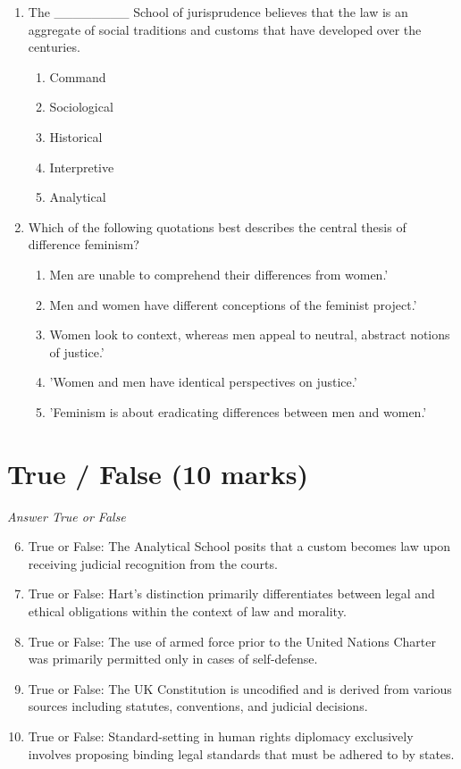 \documentclass[12pt]{article}
\begin{document}
\begin{enumerate}[label=\arabic*.]
\begin{enumerate}[label=(\alph*)]
    \item A common carrier delivering a new computer.
\end{enumerate}
\item The \_\_\_\_\_\_\_\_ School of jurisprudence believes that the law is an aggregate of social traditions and customs that have developed over the centuries.
\begin{enumerate}[label=(\alph*)]
    \item Command
    \item Sociological
    \item Historical
    \item Interpretive
    \item Analytical
\end{enumerate}
\item Which of the following quotations best describes the central thesis of difference feminism?
\begin{enumerate}[label=(\alph*)]
    \item Men are unable to comprehend their differences from women.'
    \item Men and women have different conceptions of the feminist project.'
    \item Women look to context, whereas men appeal to neutral, abstract notions of justice.'
    \item 'Women and men have identical perspectives on justice.'
    \item 'Feminism is about eradicating differences between men and women.'
\end{enumerate}
\end{enumerate}

\section*{True / False (10 marks)}
\textit{Answer True or False}
\begin{enumerate}[label=\arabic*.]
\setcounter{enumi}{5}
\item True or False: The Analytical School posits that a custom becomes law upon receiving judicial recognition from the courts.
\item True or False: Hart's distinction primarily differentiates between legal and ethical obligations within the context of law and morality.
\item True or False: The use of armed force prior to the United Nations Charter was primarily permitted only in cases of self-defense.
\item True or False: The UK Constitution is uncodified and is derived from various sources including statutes, conventions, and judicial decisions.
\item True or False: Standard-setting in human rights diplomacy exclusively involves proposing binding legal standards that must be adhered to by states.
\end{enumerate}
\end{document}
